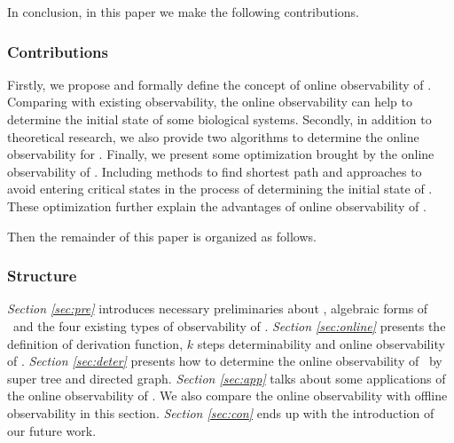 In conclusion, in this paper we make the following contributions. 


\subsubsection*{Contributions}
Firstly, we propose and formally define the concept of online observability of \BCNs. Comparing with existing observability, the online observability can help to determine the initial state of some biological systems. Secondly, in addition to theoretical research, we also provide two algorithms to determine the online observability for \BCNs. Finally, we present some optimization brought by the online observability of \BCNs. Including methods to find shortest path and approaches to avoid entering critical states in the process of determining the initial state of \BCNs.  These optimization further explain the advantages of online observability of \BCNs. %

Then the remainder of this paper is organized as follows.
\subsubsection*{Structure}
 {\em Section \ref{sec:pre}} introduces necessary preliminaries about \BCNs, algebraic forms of \BCNs\ and the four existing types of observability of  \BCNs. {\em Section \ref{sec:online}} presents the definition of derivation function, $k$ steps determinability and online observability of \BCNs. {\em Section \ref{sec:deter}} presents how to determine the online observability of \BCNs\ by super tree and directed graph. {\em Section \ref{sec:app}} talks about some applications of the online observability of \BCNs. We also compare the online observability with offline observability in this section. {\em Section \ref{sec:con}} ends up  with the introduction of our future work.


